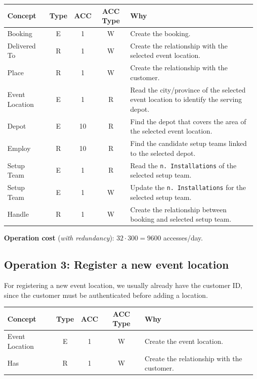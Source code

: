 \begin{table}[H]
    \centering
    \begin{tabular}{|l|c|c|c|p{6.3cm}|}
    \hline
    \textbf{Concept} & \textbf{Type} & \textbf{ACC} & \textbf{ACC Type} & \textbf{Why} \\
    \hline
    Booking & E & 1 & W & Create the booking. \\
    \hline
    Delivered To & R & 1 & W & Create the relationship with the selected event location. \\
    \hline
    Place & R & 1 & W & Create the relationship with the customer. \\
    \hline
    Event Location & E & 1 & R & Read the city/province of the selected event location to identify the serving depot. \\
    \hline
    Depot & E & 10 & R & Find the depot that covers the area of the selected event location. \\
    \hline
    Employ & R & 10 & R & Find the candidate setup teams linked to the selected depot. \\
    \hline
    Setup Team & E & 1 & R & Read the \texttt{n. Installations} of the selected setup team. \\
    \hline
    Setup Team & E & 1 & W & Update the \texttt{n. Installations} for the selected setup team. \\
    \hline
    Handle & R & 1 & W & Create the relationship between booking and selected setup team. \\
    \hline
    \end{tabular}
\end{table}

\textbf{Operation cost} (\textit{with redundancy}): $32 \cdot 300 = 9600$ accesses/day.

\subsection*{Operation 3: Register a new event location}

For registering a new event location, we usually already have the customer ID, since the customer must be authenticated before adding a location.

\begin{table}[H]
    \centering
    \begin{tabular}{|l|c|c|c|p{6.3cm}|}
    \hline
    \textbf{Concept} & \textbf{Type} & \textbf{ACC} & \textbf{ACC Type} & \textbf{Why} \\
    \hline
    Event Location & E & 1 & W & Create the event location. \\
    \hline
    Has & R & 1 & W & Create the relationship with the customer. \\
    \hline
    \end{tabular}
\end{table}

